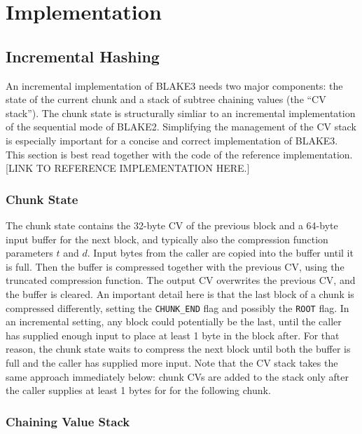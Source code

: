 \documentclass[12pt,notitlepage,a4paper]{article}
\begin{document}
\section{Implementation}\label{sec:implementation}

\subsection{Incremental Hashing}\label{sec:incremental}

An incremental implementation of BLAKE3 needs two major components: the state
of the current chunk and a stack of subtree chaining values (the ``CV stack'').
The chunk state is structurally simliar to an incremental implementation of the
sequential mode of BLAKE2. Simplifying the management of the CV stack is
especially important for a concise and correct implementation of BLAKE3. This
section is best read together with the code of the reference implementation.
[LINK TO REFERENCE IMPLEMENTATION HERE.]

\subsubsection{Chunk State}\label{sec:chunkstate}

The chunk state contains the 32-byte CV of the previous block and a 64-byte
input buffer for the next block, and typically also the compression function
parameters $t$ and $d$. Input bytes from the caller are copied into the buffer
until it is full. Then the buffer is compressed together with the previous CV,
using the truncated compression function. The output CV overwrites the previous
CV, and the buffer is cleared. An important detail here is that the last block
of a chunk is compressed differently, setting the \texttt{CHUNK\_END} flag and
possibly the \texttt{ROOT} flag. In an incremental setting, any block could
potentially be the last, until the caller has supplied enough input to place at
least 1 byte in the block after. For that reason, the chunk state waits to
compress the next block until both the buffer is full and the caller has
supplied more input. Note that the CV stack takes the same approach immediately
below: chunk CVs are added to the stack only after the caller supplies at least
1 bytes for for the following chunk.

\subsubsection{Chaining Value Stack}\label{sec:cvstack}
\end{document}
